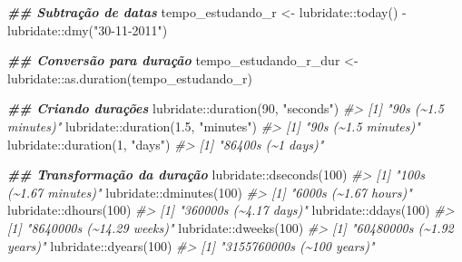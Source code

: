 \documentclass[
]{book}
\newenvironment{Shaded}{\begin{snugshade}}{\end{snugshade}}
\newcommand{\CommentTok}[1]{\textcolor[rgb]{0.37,0.37,0.37}{\textit{#1}}}
\newcommand{\DecValTok}[1]{\textcolor[rgb]{0.06,0.06,0.06}{#1}}
\newcommand{\DocumentationTok}[1]{\textcolor[rgb]{0.37,0.37,0.37}{\textbf{\textit{#1}}}}
\newcommand{\FloatTok}[1]{\textcolor[rgb]{0.06,0.06,0.06}{#1}}
\newcommand{\FunctionTok}[1]{\textcolor[rgb]{0,0,0}{#1}}
\newcommand{\NormalTok}[1]{#1}
\newcommand{\OtherTok}[1]{\textcolor[rgb]{0.37,0.37,0.37}{#1}}
\newcommand{\SpecialCharTok}[1]{\textcolor[rgb]{0,0,0}{#1}}
\newcommand{\StringTok}[1]{\textcolor[rgb]{0.5,0.5,0.5}{#1}}
\begin{document}
\begin{Shaded}
\begin{Highlighting}[]
\DocumentationTok{\#\# Subtração de datas}
\NormalTok{tempo\_estudando\_r }\OtherTok{\textless{}{-}}\NormalTok{ lubridate}\SpecialCharTok{::}\FunctionTok{today}\NormalTok{() }\SpecialCharTok{{-}}\NormalTok{ lubridate}\SpecialCharTok{::}\FunctionTok{dmy}\NormalTok{(}\StringTok{"30{-}11{-}2011"}\NormalTok{)}

\DocumentationTok{\#\# Conversão para duração}
\NormalTok{tempo\_estudando\_r\_dur }\OtherTok{\textless{}{-}}\NormalTok{ lubridate}\SpecialCharTok{::}\FunctionTok{as.duration}\NormalTok{(tempo\_estudando\_r)}

\DocumentationTok{\#\# Criando durações}
\NormalTok{lubridate}\SpecialCharTok{::}\FunctionTok{duration}\NormalTok{(}\DecValTok{90}\NormalTok{, }\StringTok{"seconds"}\NormalTok{)}
\CommentTok{\#\textgreater{} [1] "90s (\textasciitilde{}1.5 minutes)"}
\NormalTok{lubridate}\SpecialCharTok{::}\FunctionTok{duration}\NormalTok{(}\FloatTok{1.5}\NormalTok{, }\StringTok{"minutes"}\NormalTok{)}
\CommentTok{\#\textgreater{} [1] "90s (\textasciitilde{}1.5 minutes)"}
\NormalTok{lubridate}\SpecialCharTok{::}\FunctionTok{duration}\NormalTok{(}\DecValTok{1}\NormalTok{, }\StringTok{"days"}\NormalTok{)}
\CommentTok{\#\textgreater{} [1] "86400s (\textasciitilde{}1 days)"}

\DocumentationTok{\#\# Transformação da duração}
\NormalTok{lubridate}\SpecialCharTok{::}\FunctionTok{dseconds}\NormalTok{(}\DecValTok{100}\NormalTok{)}
\CommentTok{\#\textgreater{} [1] "100s (\textasciitilde{}1.67 minutes)"}
\NormalTok{lubridate}\SpecialCharTok{::}\FunctionTok{dminutes}\NormalTok{(}\DecValTok{100}\NormalTok{)}
\CommentTok{\#\textgreater{} [1] "6000s (\textasciitilde{}1.67 hours)"}
\NormalTok{lubridate}\SpecialCharTok{::}\FunctionTok{dhours}\NormalTok{(}\DecValTok{100}\NormalTok{)}
\CommentTok{\#\textgreater{} [1] "360000s (\textasciitilde{}4.17 days)"}
\NormalTok{lubridate}\SpecialCharTok{::}\FunctionTok{ddays}\NormalTok{(}\DecValTok{100}\NormalTok{)}
\CommentTok{\#\textgreater{} [1] "8640000s (\textasciitilde{}14.29 weeks)"}
\NormalTok{lubridate}\SpecialCharTok{::}\FunctionTok{dweeks}\NormalTok{(}\DecValTok{100}\NormalTok{)}
\CommentTok{\#\textgreater{} [1] "60480000s (\textasciitilde{}1.92 years)"}
\NormalTok{lubridate}\SpecialCharTok{::}\FunctionTok{dyears}\NormalTok{(}\DecValTok{100}\NormalTok{)}
\CommentTok{\#\textgreater{} [1] "3155760000s (\textasciitilde{}100 years)"}
\end{Highlighting}
\end{Shaded}
\end{document}
